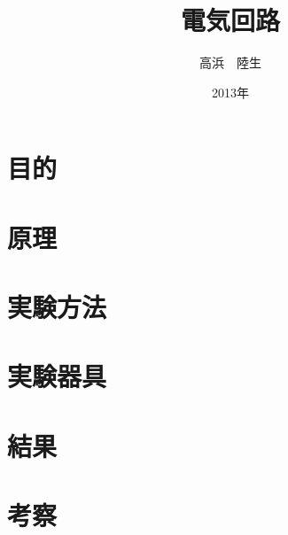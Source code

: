 \documentclass[a4j,10pt]{jarticle}
\title{電気回路}
\author{高浜　陸生}
\date{2013年}
\begin{document}
\section{目的}

\section{原理}

\section{実験方法}

\section{実験器具}

\section{結果}

\section{考察}
\end{document}
